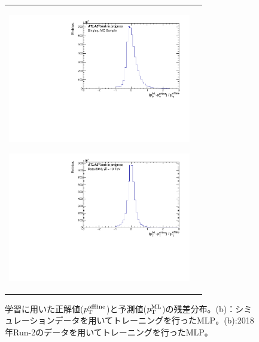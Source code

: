 \begin{figure}
    \begin{tabular}{cc}
    \centering
    \begin{minipage}[b]{0.45\hsize}%
        \centering
        \hspace*{-1.5cm}
        \includegraphics[clip, width=8cm]{fig/4/MC_predtrue.pdf}
        \subcaption{}
        \label{fig:predtrue_MC}
    \end{minipage}%
    \begin{minipage}[b]{0.7\hsize}%
        \centering
        \hspace*{-0.75cm}
        \includegraphics[clip, width=8cm]{fig/4/predtrue_perpt_v1.pdf}
        \subcaption{}
        \label{fig:predtrue_Data}
    \end{minipage}%
    \end{tabular}
    \caption{学習に用いた正解値($p_{\rm{T}}^{\rm{offline}}$)と予測値($p_{\rm{T}}^{\rm{ML}}$)の残差分布。(b)：シミュレーションデータを用いてトレーニングを行ったMLP。(b):2018年Run-2のデータを用いてトレーニングを行ったMLP。}
    \label{fig:predtrue}
\end{figure}

